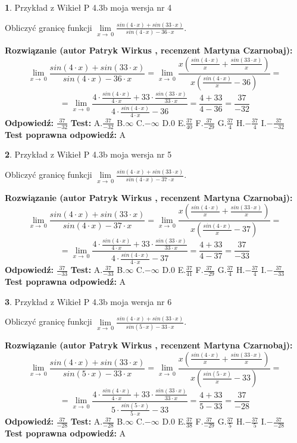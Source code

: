 \documentclass[12pt, a4paper]{article}
\theoremstyle{definition} %
\newtheorem{zad}{}
\newcommand{\zadStart}[1]{\begin{zad}#1\newline}
\newcommand{\zadStop}{\end{zad}}
\newcommand{\rozwStart}[2]{\noindent \textbf{Rozwiązanie (autor #1 , recenzent #2): }\newline}
\newcommand{\rozwStop}{\newline}
\newcommand{\odpStart}{\noindent \textbf{Odpowiedź:}\newline}
\newcommand{\odpStop}{\newline}
\newcommand{\testStart}{\noindent \textbf{Test:}\newline}
\newcommand{\testStop}{\newline}
\newcommand{\kluczStart}{\noindent \textbf{Test poprawna odpowiedź:}\newline}
\newcommand{\kluczStop}{\newline}
\begin{document}
\zadStart{Przykład z Wikieł P 4.3b moja wersja nr 4}


Obliczyć granicę funkcji $\lim\limits_{x\to\ 0}\frac{sin(4 \cdot x)+sin(33 \cdot x)}{sin(4 \cdot x)-36 \cdot x}$.
\zadStop
\rozwStart{Patryk Wirkus}{Martyna Czarnobaj}
$$\lim\limits_{x\to\ 0}\frac{sin(4 \cdot x)+sin(33 \cdot x)}{sin(4 \cdot x)-36 \cdot x}=\lim\limits_{x\to\ 0}\frac{x(\frac{sin(4 \cdot x)}{x}+\frac{sin(33 \cdot x)}{x})}{x(\frac{sin(4 \cdot x)}{x}-36)}=$$
$$=\lim\limits_{x\to\ 0}\frac{4 \cdot \frac{sin(4 \cdot x)}{4 \cdot x}+33 \cdot \frac{sin(33 \cdot x)}{33 \cdot x}}{4 \cdot \frac{sin(4 \cdot x)}{4 \cdot x}-36}=\frac{4+33}{4-36} = \frac{37}{-32}$$
\rozwStop
\odpStart
$\frac{37}{-32}$
\odpStop
\testStart
A.$\frac{37}{-32}$
B.$\infty$
C.$-\infty$
D.$0$
E.$\frac{37}{40}$
F.$\frac{37}{-29}$
G.$\frac{37}{4}$
H.$-\frac{37}{4}$
I.$-\frac{37}{-32}$
\testStop
\kluczStart
A
\kluczStop



\zadStart{Przykład z Wikieł P 4.3b moja wersja nr 5}


Obliczyć granicę funkcji $\lim\limits_{x\to\ 0}\frac{sin(4 \cdot x)+sin(33 \cdot x)}{sin(4 \cdot x)-37 \cdot x}$.
\zadStop
\rozwStart{Patryk Wirkus}{Martyna Czarnobaj}
$$\lim\limits_{x\to\ 0}\frac{sin(4 \cdot x)+sin(33 \cdot x)}{sin(4 \cdot x)-37 \cdot x}=\lim\limits_{x\to\ 0}\frac{x(\frac{sin(4 \cdot x)}{x}+\frac{sin(33 \cdot x)}{x})}{x(\frac{sin(4 \cdot x)}{x}-37)}=$$
$$=\lim\limits_{x\to\ 0}\frac{4 \cdot \frac{sin(4 \cdot x)}{4 \cdot x}+33 \cdot \frac{sin(33 \cdot x)}{33 \cdot x}}{4 \cdot \frac{sin(4 \cdot x)}{4 \cdot x}-37}=\frac{4+33}{4-37} = \frac{37}{-33}$$
\rozwStop
\odpStart
$\frac{37}{-33}$
\odpStop
\testStart
A.$\frac{37}{-33}$
B.$\infty$
C.$-\infty$
D.$0$
E.$\frac{37}{41}$
F.$\frac{37}{-29}$
G.$\frac{37}{4}$
H.$-\frac{37}{4}$
I.$-\frac{37}{-33}$
\testStop
\kluczStart
A
\kluczStop



\zadStart{Przykład z Wikieł P 4.3b moja wersja nr 6}


Obliczyć granicę funkcji $\lim\limits_{x\to\ 0}\frac{sin(4 \cdot x)+sin(33 \cdot x)}{sin(5 \cdot x)-33 \cdot x}$.
\zadStop
\rozwStart{Patryk Wirkus}{Martyna Czarnobaj}
$$\lim\limits_{x\to\ 0}\frac{sin(4 \cdot x)+sin(33 \cdot x)}{sin(5 \cdot x)-33 \cdot x}=\lim\limits_{x\to\ 0}\frac{x(\frac{sin(4 \cdot x)}{x}+\frac{sin(33 \cdot x)}{x})}{x(\frac{sin(5 \cdot x)}{x}-33)}=$$
$$=\lim\limits_{x\to\ 0}\frac{4 \cdot \frac{sin(4 \cdot x)}{4 \cdot x}+33 \cdot \frac{sin(33 \cdot x)}{33 \cdot x}}{5 \cdot \frac{sin(5 \cdot x)}{5 \cdot x}-33}=\frac{4+33}{5-33} = \frac{37}{-28}$$
\rozwStop
\odpStart
$\frac{37}{-28}$
\odpStop
\testStart
A.$\frac{37}{-28}$
B.$\infty$
C.$-\infty$
D.$0$
E.$\frac{37}{38}$
F.$\frac{37}{-29}$
G.$\frac{37}{5}$
H.$-\frac{37}{5}$
I.$-\frac{37}{-28}$
\testStop
\kluczStart
A
\kluczStop
\end{document}
